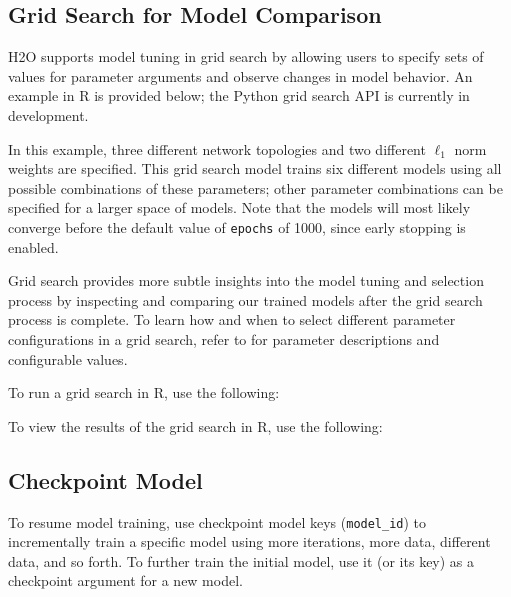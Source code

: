 {{\subsection{Grid Search for Model Comparison} 
\label{ssec:GridSearch}

H2O supports model tuning in  grid search by allowing users to specify sets of values for parameter arguments and observe changes in model behavior. An example in R is provided below; the Python grid search API is currently in development.   

In this example, three different network topologies and two different $\ell_1$ norm weights are specified. This grid search model trains six different models using all possible combinations of these parameters; other parameter combinations can be specified for a larger space of models. Note that the models will most likely converge before the default value of \texttt{epochs} of 1000, since early stopping is enabled.

Grid search provides more subtle insights into the model tuning and selection process by inspecting and comparing our trained models after the grid search process is complete. To learn how and when to select different parameter configurations in a grid search, refer to {\textbf{}} for parameter descriptions and configurable values. 

\waterExampleInR
To run a grid search in R, use the following:


%

\normalsize
\noindent
\newpage
\waterExampleInR
To view the results of the grid search in R, use the following: 


%


\subsection{Checkpoint Model}

To resume model training, use checkpoint model keys (\texttt{model\_id}) to incrementally train a specific model using more iterations, more data, different data, and so forth. To further train the initial model, use it (or its key) as a checkpoint argument for a new model.

}}
